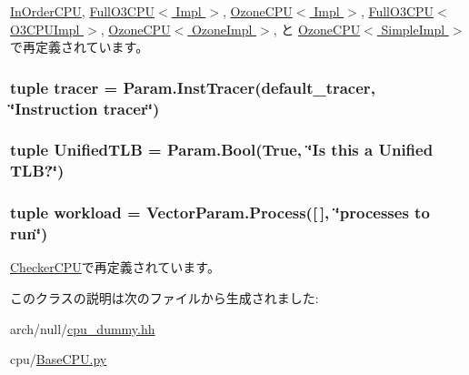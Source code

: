 \hyperlink{classInOrderCPU_af27ccd765f13a4b7bd119dc7579e2746}{InOrderCPU}, \hyperlink{classFullO3CPU_af27ccd765f13a4b7bd119dc7579e2746}{FullO3CPU$<$ Impl $>$}, \hyperlink{classOzoneCPU_af27ccd765f13a4b7bd119dc7579e2746}{OzoneCPU$<$ Impl $>$}, \hyperlink{classFullO3CPU_af27ccd765f13a4b7bd119dc7579e2746}{FullO3CPU$<$ O3CPUImpl $>$}, \hyperlink{classOzoneCPU_af27ccd765f13a4b7bd119dc7579e2746}{OzoneCPU$<$ OzoneImpl $>$}, と \hyperlink{classOzoneCPU_af27ccd765f13a4b7bd119dc7579e2746}{OzoneCPU$<$ SimpleImpl $>$}で再定義されています。\hypertarget{classBaseCPU_a93e5e48e5669646bc5b83b93fafe6a22}{
\subsubsection[{toL2Bus}]{}}
\label{classBaseCPU_a93e5e48e5669646bc5b83b93fafe6a22}
\hypertarget{classBaseCPU_a7deba7e62c47a4cf4b9f5516fad8b175}{
\subsubsection[{tracer}]{\setlength{\rightskip}{0pt plus 5cm}tuple {\bf tracer} = Param.InstTracer({\bf default\_\-tracer}, \char`\"{}Instruction {\bf tracer}\char`\"{})}}
\label{classBaseCPU_a7deba7e62c47a4cf4b9f5516fad8b175}
\hypertarget{classBaseCPU_a2d5c6392dac36249566c6dd1ab1629cd}{
\subsubsection[{UnifiedTLB}]{\setlength{\rightskip}{0pt plus 5cm}tuple {\bf UnifiedTLB} = Param.Bool(True, \char`\"{}Is this a Unified TLB?\char`\"{})}}
\label{classBaseCPU_a2d5c6392dac36249566c6dd1ab1629cd}
\hypertarget{classBaseCPU_a73d872f4e6fdf59531004dac33e2cd93}{
\subsubsection[{workload}]{\setlength{\rightskip}{0pt plus 5cm}tuple {\bf workload} = VectorParam.Process(\mbox{[}$\,$\mbox{]}, \char`\"{}processes to run\char`\"{})}}
\label{classBaseCPU_a73d872f4e6fdf59531004dac33e2cd93}


\hyperlink{classCheckerCPU_a9b2cb3a230c37a5bb09eca1375e1a5bf}{CheckerCPU}で再定義されています。

このクラスの説明は次のファイルから生成されました:\begin{DoxyCompactItemize}
\item 
arch/null/\hyperlink{cpu__dummy_8hh}{cpu\_\-dummy.hh}\item 
cpu/\hyperlink{BaseCPU_8py}{BaseCPU.py}\end{DoxyCompactItemize}

